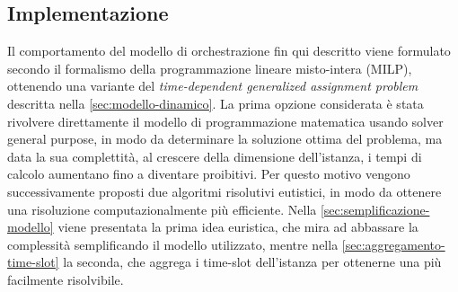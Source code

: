 %
%
\subsection{Implementazione}
\label{sub-sec:implementazione}

Il comportamento del modello di orchestrazione fin qui descritto viene formulato secondo il formalismo della programmazione lineare misto-intera (MILP), ottenendo una variante del \textit{time-dependent generalized assignment problem} descritta nella \autoref{sec:modello-dinamico}. La prima opzione considerata è stata rivolvere direttamente il modello di programmazione matematica usando solver general purpose, in modo da determinare la soluzione ottima del problema, ma data la sua complettità, al crescere della dimensione dell'istanza, i tempi di calcolo aumentano fino a diventare proibitivi. Per questo motivo vengono successivamente proposti due algoritmi risolutivi eutistici, in modo da ottenere una risoluzione computazionalmente più efficiente. Nella \autoref{sec:semplificazione-modello} viene presentata la prima idea euristica, che mira ad abbassare la complessità semplificando il modello utilizzato, mentre nella \autoref{sec:aggregamento-time-slot} la seconda, che aggrega i time-slot dell'istanza per ottenerne una più facilmente risolvibile.
